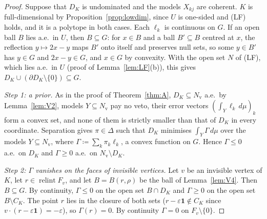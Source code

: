\documentclass[11pt]{article}
\newcommand{\one}{\mathbf{1}}
\DeclareMathOperator{\relint}{relint}
\theoremstyle{plain}
\theoremstyle{definition}
\theoremstyle{remark}
\begin{document}
\begin{proof}
Suppose that $D_K$ is undominated and the models $X_{kj}$ are coherent. $K$ is
full-dimensional by Proposition~\ref{prop:lowdim}, since $U$ is one-sided and (LF)
holds, and it is a polytope in both cases. Each $\ell_k$ is continuous on $G$. If an open
ball $B$ lies a.e.\ in $U$, then $B\subseteq G$: for $x\in B$ and a ball $B'\subseteq B$
centred at $x$, the reflection $y\mapsto2x-y$ maps $B'$ onto itself and preserves null
sets, so some $y\in B'$ has $y\in G$ and $2x-y\in G$, and $x\in G$ by convexity. With the
open set $N$ of (LF), which lies a.e.\ in $U$ (proof of Lemma~\ref{lem:LF}(b)), this gives
$D_K\cup(\partial D_K\setminus\{0\})\subseteq G$.

\emph{Step 1: a prior.} As in the proof of Theorem~\ref{thm:A}, $D_K\subseteq N_{\mathrm
v}$ a.e.\ by Lemma~\ref{lem:V2}, models $Y\subseteq N_{\mathrm v}$ pay no veto, their
error vectors $(\int_Y\ell_k\,d\mu)_k$ form a convex set, and none of them is strictly
smaller than that of $D_K$ in every coordinate. Separation gives $\pi\in\Delta$ such that
$D_K$ minimises $\int_Y\Gamma\,d\mu$ over the models $Y\subseteq N_{\mathrm v}$, where
$\Gamma\coloneqq\sum_k\pi_k\ell_k$, a convex function on $G$. Hence $\Gamma\le0$ a.e.\ on
$D_K$ and $\Gamma\ge0$ a.e.\ on $N_{\mathrm v}\setminus D_K$.

\emph{Step 2: $\Gamma$ vanishes on the faces of invisible vertices.} Let $v$ be an
invisible vertex of $K$, let $r\in\relint F_v$, and let $B=B(r,\rho)$ be the ball of
Lemma~\ref{lem:V4}. Then $B\subseteq G$. By continuity, $\Gamma\le0$ on the open set
$B\cap D_K$ and $\Gamma\ge0$ on the open set $B\setminus C_K$. The point $r$ lies in the
closure of both sets ($r-\varepsilon\one\notin C_K$ since $v\cdot(r-\varepsilon\one)=
-\varepsilon$), so $\Gamma(r)=0$. By continuity $\Gamma=0$ on $F_v\setminus\{0\}$.


\end{proof}
\end{document}
